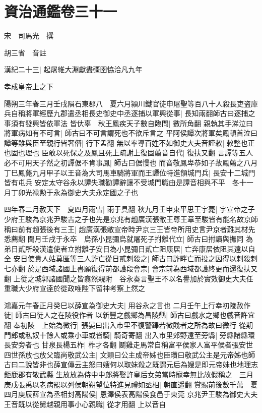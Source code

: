 \chapter{資治通鑑卷三十一}
宋　司馬光　撰

胡三省　音註

漢紀二十三|{
	起屠維大淵獻盡彊圉恊洽凡九年}


孝成皇帝上之下

陽朔三年春三月壬戌隕石東郡八　夏六月潁川鐵官徒申屠聖等百八十人殺長吏盗庫兵自稱將軍經歷九郡遣丞相長史御史中丞逐捕以軍興從事|{
	長知兩翻師古曰逐捕之事須有發興皆依軍法}
皆㐲辜　秋王鳳疾天子數自臨問|{
	數所角翻}
親執其手涕泣曰將軍病如有不可言|{
	師古曰不可言謂死也不欲斥言之}
平阿侯譚次將軍矣鳳頓首泣曰譚等雖與臣至親行皆奢僭|{
	行下孟翻}
無以率導百姓不如御史大夫音謹敕|{
	敕整也正也固也理也}
臣敢以死保之及鳳且死上疏謝上復固薦音自代|{
	復扶又翻}
言譚等五人必不可用天子然之初譚倨不肯事鳳|{
	師古曰倨慢也}
而音敬鳳卑恭如子故鳳薦之八月丁巳鳳薨九月甲子以王音為大司馬車騎將軍而王譚位特進領城門兵|{
	長安十二城門皆有屯兵}
安定太守谷永以譚失職勸譚辭讓不受城門職由是譚音相與不平　冬十一月丁卯光禄勲于永為御史大夫永定國之子也

四年春二月赦天下　夏四月雨雪|{
	雨于具翻}
秋九月壬申東平思王宇薨|{
	宇宣帝之子}
少府王駿為京兆尹駿吉之子也先是京兆有趙廣漢張敞王尊王章至駿皆有能名故京師稱曰前有趙張後有三王|{
	趙廣漢張敞宣帝時尹京三王皆帝所用史言尹京者難其材先悉薦翻}
閏月壬戌于永卒　烏孫小昆彌烏就屠死子拊離代立|{
	師古曰拊讀與撫同}
為弟日貳所殺漢遣使者立拊離子安日為小昆彌日貳亡阻康居|{
	亡奔康居依阻其遠以自全}
安日使貴人姑莫匿等三人詐亡從日貳刺殺之|{
	師古曰詐畔亡而投之因得以刺殺刺七亦翻}
於是西域諸國上書願復得前都護段會宗|{
	會宗前為西域都護終更而還復扶又翻}
上從之城郭諸國聞之皆翕然親附　谷永奏言聖王不以名譽加於實效御史大夫任重職大少府宣逹於從政唯陛下留神考察上然之

鴻嘉元年春正月癸巳以薛宣為御史大夫|{
	用谷永之言也}
二月壬午上行幸初陵赦作徒|{
	師古曰徒人之在陵役作者}
以新豐之戲鄉為昌陵縣|{
	師古曰戲水之鄉也戲音許宜翻}
奉初陵　上始為微行|{
	張晏曰出入市里不復警蹕若微賤者之所為故曰微行}
從期門郎或私奴十餘人或乘小車或皆騎|{
	騎奇寄翻}
出入市里郊野遠至旁縣|{
	旁縣諸縣環長安旁者也}
甘泉長楊五柞|{
	柞才各翻}
鬭雞走馬常自稱富平侯家人富平侯者張安世四世孫放也放父臨尚敬武公主|{
	文穎曰公主成帝姊也臣瓚曰敬武公主是元帝姊也師古曰二說皆非也薛宣傳云主怒曰嫂何以取妺殺之既謂元后為嫂是即元帝妹也地理志鉅鹿郡有敬武縣}
生放放為侍中中郎將娶許皇后女弟當時寵幸無比故假稱之　三月庚戌張禹以老病罷以列侯朝朔望位特進見禮如丞相|{
	朝直遥翻}
賞賜前後數千萬　夏四月庚辰薛宣為丞相封高陽侯|{
	恩澤侯表高陽侯食邑于東莞}
京兆尹王駿為御史大夫王音既以從舅越親用事小心親職|{
	從才用翻}
上以音自

